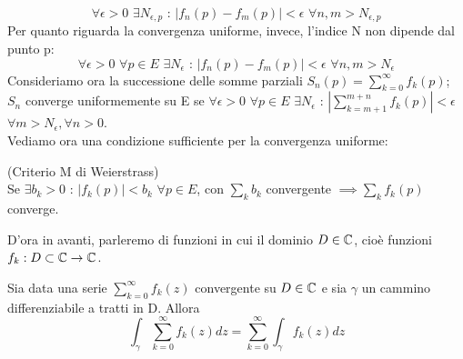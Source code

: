 $$\forall \epsilon >0 \, \, \exists N_{\epsilon, p} \text{ : } |f_n(p) -f_m(p)| < \epsilon \, \, \forall n,m>N_{\epsilon, p}$$ 
Per quanto riguarda la convergenza uniforme, invece, l'indice N non dipende dal punto p:
$$\forall \epsilon >0 \,\, \forall p \in E \, \, \exists N_{\epsilon} \text{ : } |f_n(p) -f_m(p)| < \epsilon \, \, \forall n,m>N_{\epsilon}$$
Consideriamo ora la successione delle somme parziali $S_n(p)=\sum_{k=0} ^{\infty} f_k(p)$; $S_n$ converge uniformemente su E se $\forall \epsilon >0 \, \, \forall p \in E \, \, \exists N_{\epsilon}$ : $|\sum_{k=m+1} ^{m+n} f_k(p)| < \epsilon$ $\forall m>N_{\epsilon}, \forall n>0$.
\\Vediamo ora una condizione sufficiente per la convergenza uniforme:
\begin{teorema} (Criterio M di Weierstrass)\\
Se $\exists b_k>0$ : $|f_k(p)|<b_k$ $\forall p \in E$, con $\sum_k b_k$ convergente $\implies \sum_k f_k(p)$ converge.
\end{teorema}
D'ora in avanti, parleremo di funzioni in cui il dominio $D \in \mathbb{C}$, cioè funzioni $f_k:D \subset \mathbb{C} \to \mathbb{C}$.
\begin{teorema}
Sia data una serie $\sum_{k=0} ^{\infty} f_k(z)$ convergente su $D \in \mathbb{C}$ e sia $\gamma$ un cammino differenziabile a tratti in D. Allora 
$$\int_{\gamma} \sum_{k=0} ^{\infty} f_k(z) dz=\sum_{k=0} ^{\infty} \int_{\gamma} f_k(z) dz$$
\end{teorema}

